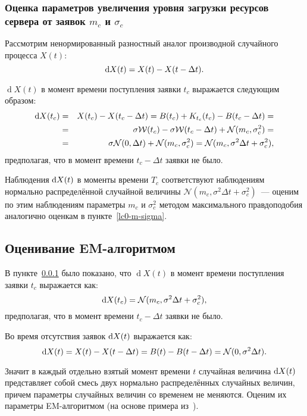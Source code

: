 \documentclass[a4paper,10pt]{article}
\begin{document}
\subsubsection{Оценка параметров увеличения уровня загрузки ресурсов сервера %
от заявок $m_c$ и $\sigma_c$}%
\label{lc0-mc-sigmac}
Рассмотрим ненормированный разностный аналог производной 
случайного процесса $X(t)$:
$$\dif X(t) = X(t) - X(t - \Delta t).$$

$\operatorname{d}X(t)$ в момент времени поступления заявки $t_c$ 
выражается следующим образом:
\begin{eqnarray*}
\dif X(t_c) 
  & = & X(t_c) - X(t_c - \Delta t) = 
      B(t_c) + K_{t_c}(t_c) - B(t_c - \Delta t) = \\
  & = & \sigma \mathcal{W}(t_c) - \sigma \mathcal{W}(t_c - \Delta t) + 
      \mathcal{N}(m_c, \sigma_c^2) = \\
  & = & \sigma \mathcal{N}(0, \Delta t) + \mathcal{N}(m_c, \sigma_c^2) =
      \mathcal{N}(m_c, \sigma^2 \Delta t + \sigma_c^2),
\end{eqnarray*}
предполагая, что в момент времени $t_c - \Delta t$ заявки не было.

Наблюдения $\dif X(t)$ в моменты времени $T_c$ соответствуют наблюдениям 
нормально распределённой случайной величины 
$\mathcal{N}(m_c, \sigma^2 \Delta t + \sigma_c^2)$~--- 
оценим по этим наблюдениям параметры $m_c$ и $\sigma_c^2$ 
методом максимального правдоподобия аналогично оценкам в 
пункте~\ref{lc0-m-sigma}.

\subsection{Оценивание EM-алгоритмом}%
\label{EM}
В пункте~\ref{lc0-mc-sigmac} было показано, 
что $\operatorname{d}X(t)$ в момент времени поступления заявки $t_c$ 
выражается как:
$$
  \dif X(t_c) = \mathcal{N}(m_c, \sigma^2 \Delta t + \sigma_c^2),
$$
предполагая, что в момент времени $t_c - \Delta t$ заявки не было.

Во время отсутствия заявок $\dif X(t)$ выражается как:
$$
\dif X(t) = X(t) - X(t - \Delta t) = 
    B(t) - B(t - \Delta t) =
    \mathcal{N}(0, \sigma^2 \Delta t).
$$

Значит в каждый отдельно взятый момент времени $t$ 
случайная величина $\dif X(t)$ представляет собой смесь двух нормально 
распределённых случайных величин, 
причем параметры случайных величин со временем не меняются.
Оценим их параметры EM-алгоритмом 
(на основе примера из~\cite{wiki:em-algorithm}).
\end{document}
